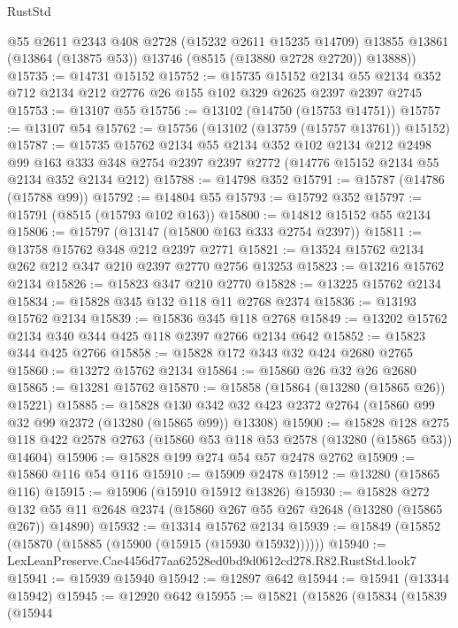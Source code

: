 \begin{lexlean}{RustStd}
\begin{coremodule}
        @55
        @2611
        @2343
        @408
        @2728
        (@15232 @2611 @15235 @14709)
        @13855
        @13861
        (@13864 (@13875 @53))
        @13746
        (@8515 (@13880 @2728 @2720))
        @13888))
@15735 := @14731 @15152
@15752 := @15735
    @15152
    @2134
    @55
    @2134
    @352
    @712
    @2134
    @212
    @2776
    @26
    @155
    @102
    @329
    @2625
    @2397
    @2397
    @2745
@15753 := @13107 @55
@15756 := @13102 (@14750 (@15753 @14751))
@15757 := @13107 @54
@15762 := @15756 (@13102 (@13759 (@15757 @13761)) @15152)
@15787 := @15735
    @15762
    @2134
    @55
    @2134
    @352
    @102
    @2134
    @212
    @2498
    @99
    @163
    @333
    @348
    @2754
    @2397
    @2397
    @2772
    (@14776 @15152 @2134 @55 @2134 @352 @2134 @212)
@15788 := @14798 @352
@15791 := @15787 (@14786 (@15788 @99))
@15792 := @14804 @55
@15793 := @15792 @352
@15797 := @15791 (@8515 (@15793 @102 @163))
@15800 := @14812 @15152 @55 @2134
@15806 := @15797 (@13147 (@15800 @163 @333 @2754 @2397))
@15811 := @13758 @15762 @348 @212 @2397 @2771
@15821 := @13524 @15762 @2134 @262 @212 @347 @210 @2397 @2770 @2756 @13253
@15823 := @13216 @15762 @2134
@15826 := @15823 @347 @210 @2770
@15828 := @13225 @15762 @2134
@15834 := @15828 @345 @132 @118 @11 @2768 @2374
@15836 := @13193 @15762 @2134
@15839 := @15836 @345 @118 @2768
@15849 := @13202 @15762 @2134 @340 @344 @425 @118 @2397 @2766 @2134 @642
@15852 := @15823 @344 @425 @2766
@15858 := @15828 @172 @343 @32 @424 @2680 @2765
@15860 := @13272 @15762 @2134
@15864 := @15860 @26 @32 @26 @2680
@15865 := @13281 @15762
@15870 := @15858 (@15864 (@13280 (@15865 @26)) @15221)
@15885 := @15828
    @130
    @342
    @32
    @423
    @2372
    @2764
    (@15860 @99 @32 @99 @2372 (@13280 (@15865 @99)) @13308)
@15900 := @15828
    @128
    @275
    @118
    @422
    @2578
    @2763
    (@15860 @53 @118 @53 @2578 (@13280 (@15865 @53)) @14604)
@15906 := @15828 @199 @274 @54 @57 @2478 @2762
@15909 := @15860 @116 @54 @116
@15910 := @15909 @2478
@15912 := @13280 (@15865 @116)
@15915 := @15906 (@15910 @15912 @13826)
@15930 := @15828
    @272
    @132
    @55
    @11
    @2648
    @2374
    (@15860 @267 @55 @267 @2648 (@13280 (@15865 @267)) @14890)
@15932 := @13314 @15762 @2134
@15939 := @15849 (@15852 (@15870 (@15885 (@15900 (@15915 (@15930 @15932))))))
@15940 := LexLeanPreserve.Cae4456d77aa62528ed0bd9d0612cd278.R82.RustStd.look7
@15941 := @15939 @15940
@15942 := @12897 @642
@15944 := @15941 (@13344 @15942)
@15945 := @12920 @642
@15955 := @15821
    (@15826
      (@15834
        (@15839
          (@15944

\end{coremodule}
\end{lexlean}
